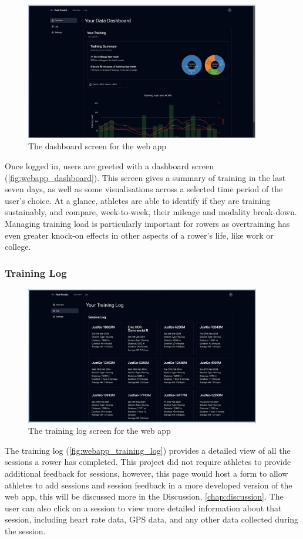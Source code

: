 \begin{figure}[htbp]
  \centering
  \includegraphics[height=6cm]{figures/fyp_dash_overview.jpeg}
  \captionsetup{justification=centering}
  \caption[Web app Dashboard]{The dashboard screen for the web app} \label{fig:webapp_dashboard}
\end{figure}

Once logged in, users are greeted with a dashboard screen (\autoref{fig:webapp_dashboard}). This screen gives a summary of training in the last seven days, as well as some visualisations across a selected time period of the user's choice. At a glance, athletes are able to identify if they are training sustainably, and compare, week-to-week, their mileage and modality break-down. Managing training load is particularly important for rowers as overtraining has even greater knock-on effects in other aspects of a rower's life, like work or college.

\subsubsection{Training Log}

\begin{figure}[htbp]
  \centering
  \includegraphics[height=6cm]{figures/fyp_training_log.jpeg}
  \captionsetup{justification=centering}
  \caption[Web app Training Log]{The training log screen for the web app} \label{fig:webapp_training_log}
\end{figure}
The training log (\autoref{fig:webapp_training_log}) provides a detailed view of all the sessions a rower has completed. This project did not require athletes to provide additional feedback for sessions, however, this page would host a form to allow athletes to add sessions and session feedback in a more developed version of the web app, this will be discussed more in the Discussion, \autoref{chap:discussion}. The user can also click on a session to view more detailed information about that session, including heart rate data, GPS data, and any other data collected during the session. 

